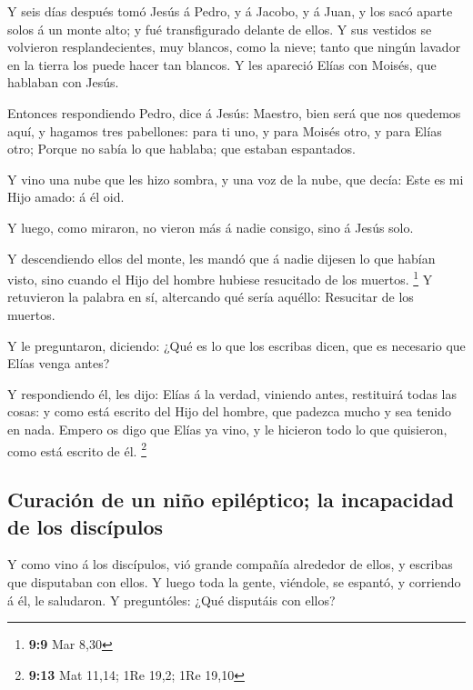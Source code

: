  Y seis días después tomó Jesús á Pedro, y á Jacobo, y á
Juan, y los sacó aparte solos á un monte alto; y fué transfigurado
delante de ellos.  Y sus vestidos se volvieron
resplandecientes, muy blancos, como la nieve; tanto que ningún lavador
en la tierra los puede hacer tan blancos.  Y les apareció
Elías con Moisés, que hablaban con Jesús.

 Entonces respondiendo Pedro, dice á Jesús: Maestro, bien
será que nos quedemos aquí, y hagamos tres pabellones: para ti uno, y
para Moisés otro, y para Elías otro;  Porque no sabía lo que
hablaba; que estaban espantados.

 Y vino una nube que les hizo sombra, y una voz de la nube,
que decía: Este es mi Hijo amado: á él oid.

 Y luego, como miraron, no vieron más á nadie consigo, sino
á Jesús solo.

 Y descendiendo ellos del monte, les mandó que á nadie
dijesen lo que habían visto, sino cuando el Hijo del hombre hubiese
resucitado de los muertos. \footnote{\textbf{9:9} Mar 8,30}
 Y retuvieron la palabra en sí, altercando qué sería
aquéllo: Resucitar de los muertos.

 Y le preguntaron, diciendo: ¿Qué es lo que los escribas
dicen, que es necesario que Elías venga antes?

 Y respondiendo él, les dijo: Elías á la verdad, viniendo
antes, restituirá todas las cosas: y como está escrito del Hijo del
hombre, que padezca mucho y sea tenido en nada.  Empero os
digo que Elías ya vino, y le hicieron todo lo que quisieron, como está
escrito de él. \footnote{\textbf{9:13} Mat 11,14; 1Re 19,2; 1Re 19,10}

\hypertarget{curaciuxf3n-de-un-niuxf1o-epiluxe9ptico-la-incapacidad-de-los-discuxedpulos}{%
\subsection{Curación de un niño epiléptico; la incapacidad de los
discípulos}\label{curaciuxf3n-de-un-niuxf1o-epiluxe9ptico-la-incapacidad-de-los-discuxedpulos}}

 Y como vino á los discípulos, vió grande compañía
alrededor de ellos, y escribas que disputaban con ellos.  Y
luego toda la gente, viéndole, se espantó, y corriendo á él, le
saludaron.  Y preguntóles: ¿Qué disputáis con ellos?

